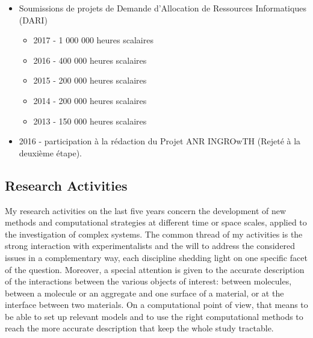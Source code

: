 \documentclass[11pt]{artuppax}
\newcounter{subsec}[section]
\begin{document}
\begin{itemize}
    \item Soumissions de projets de Demande d'Allocation de Ressources Informatiques (DARI)
    \begin{itemize}
        \item 2017 - 1 000 000 heures scalaires
        \item 2016 - 400 000 heures scalaires
        \item 2015 - 200 000 heures scalaires
        \item 2014 - 200 000 heures scalaires
        \item 2013 - 150 000 heures scalaires
    \end{itemize}
    \item 2016 - participation à la rédaction du Projet ANR INGROwTH (Rejeté à la deuxième étape).
\end{itemize}


\subsection{Research Activities}

My research activities on the last five years concern the development of new methods and
computational strategies at different time or space scales, applied to the investigation
of complex systems. The common thread of my activities is the strong interaction
with experimentalists and the will to address the considered issues in a complementary way,
each discipline shedding light on one specific facet of the question. Moreover, a special
attention is given to the accurate description of the interactions between the various objects of interest:
between molecules, between a molecule or an aggregate and one surface of a material, or
at the interface between two materials. On a computational point of view, that means to
be able to set up relevant models and to use the right computational methods to reach the
more accurate description that keep the whole study tractable.
\end{document}
